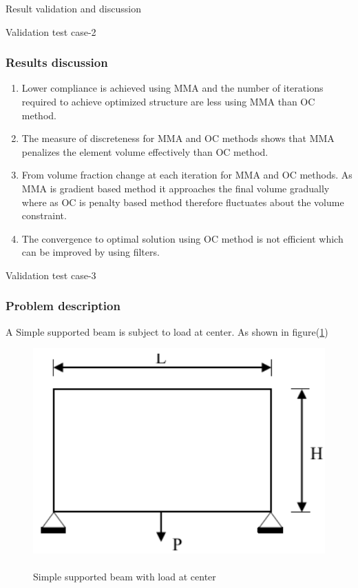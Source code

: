 \documentclass[a4paper,12pt,times]{article}
\begin{document}
\begin{section}{Result validation and discussion}
\begin{subsection}{Validation test case-2}
\subsubsection{Results discussion}
\begin{enumerate}
\item Lower compliance is achieved using MMA and the number of iterations required to achieve optimized structure are less using MMA than OC method.

\item The measure of discreteness for MMA and OC methods shows that MMA penalizes the element volume effectively than OC method.

\item From volume fraction change at each iteration for MMA and OC methods. As MMA is gradient based method it approaches the final volume gradually where as OC is penalty based method therefore fluctuates about the volume constraint.

\item The convergence to optimal solution using OC method is not efficient which can be improved by using filters.
\end{enumerate}

\end{subsection}


\begin{subsection}{Validation test case-3}
\subsubsection{Problem description}
A Simple supported beam is subject to load at center. As shown in figure(\ref{fig:problem-3})
\begin{figure}[H]
	\begin{center}
		\includegraphics[scale=0.5]{Problem-3.png} 
		\caption{\\Simple supported beam with load at center}\label{fig:problem-3}
	\end{center}	
\end{figure}


\end{subsection}
\end{section}
\end{document}
